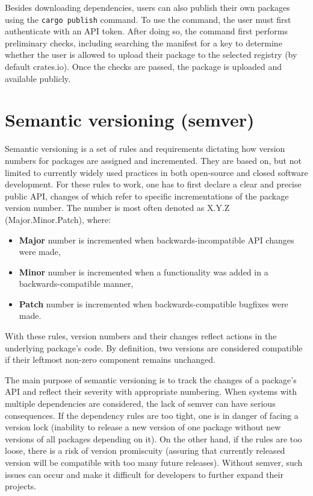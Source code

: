 \documentclass[licencjacka,en]{pracamgr}
\begin{document}
Besides downloading dependencies, users can also publish their own packages using
the \texttt{cargo publish} command. To use the command, the user must first authenticate with
an API token. After doing so, the command first performs preliminary checks, including searching
the manifest for a key to determine whether the user is allowed to upload their package
to the selected registry (by default crates.io). Once the checks are passed, the package is
uploaded and available publicly.

\section{Semantic versioning (semver)}\label{r:section_semver}

Semantic versioning is a set of rules and requirements dictating how version numbers for packages
are assigned and incremented. They are based on, but not limited to currently widely used
practices in both open-source and closed software development. For these rules to work, one has to
first declare a clear and precise public API, changes of which refer to specific incrementations of
the package version number. The number is most often denoted as X.Y.Z (Major.Minor.Patch), where:
\begin{itemize}
	\item \textbf{Major} number is incremented when backwards-incompatible API changes were made,
	\item \textbf{Minor} number is incremented when a functionality was added in
		a backwards-compatible manner,
	\item \textbf{Patch} number is incremented when backwards-compatible bugfixes were made.
\end{itemize}
With these rules, version numbers and their changes reflect actions in the underlying
package's code. By definition, two versions are considered compatible if their leftmost non-zero
component remains unchanged.

The main purpose of semantic versioning is to track the changes of a package's API and reflect
their severity with appropriate numbering.
When systems with multiple dependencies are considered, the lack of semver can have serious
consequences. If the dependency rules are too tight, one is in danger of facing a version lock
(inability to release a new version of one package without new versions of all packages depending
on it). On the other hand, if the rules are too loose, there is a risk of version promiscuity
(assuring that currently released version will be compatible with too many future releases).
Without semver, such issues can occur and make it difficult for developers to further expand
their projects.
\end{document}
